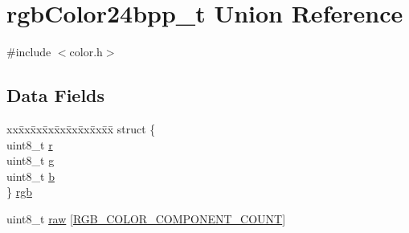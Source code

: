 \hypertarget{unionrgbColor24bpp__t}{\section{rgb\+Color24bpp\+\_\+t Union Reference}
\label{unionrgbColor24bpp__t}
}


{\ttfamily \#include $<$color.\+h$>$}

\subsection*{Data Fields}
\begin{DoxyCompactItemize}
\item 
\begin{tabbing}
xx\=xx\=xx\=xx\=xx\=xx\=xx\=xx\=xx\=\kill
struct \{\\
\>uint8\_t \hyperlink{unionrgbColor24bpp__t_a36ecdd52162baf9d8f1a809d545702e1}{r}\\
\>uint8\_t \hyperlink{unionrgbColor24bpp__t_a25543b264564b203d170d18f4ddb462f}{g}\\
\>uint8\_t \hyperlink{unionrgbColor24bpp__t_a1370c0fd17019d34a9517a48779fea4c}{b}\\
\} \hyperlink{unionrgbColor24bpp__t_aa279c304f032ad531667db94ea7244be}{rgb}\\

\end{tabbing}\item 
uint8\+\_\+t \hyperlink{unionrgbColor24bpp__t_a43d8155d43e2cdacb28bc8a2ea5e7afd}{raw} \mbox{[}\hyperlink{color_8h_ab46567fddd5a18067fdfe8c834a58ad6}{R\+G\+B\+\_\+\+C\+O\+L\+O\+R\+\_\+\+C\+O\+M\+P\+O\+N\+E\+N\+T\+\_\+\+C\+O\+U\+N\+T}\mbox{]}
\end{DoxyCompactItemize}


